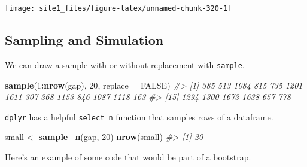 \documentclass[]{book}
\newenvironment{Shaded}{\begin{snugshade}}{\end{snugshade}}
\newcommand{\KeywordTok}[1]{\textcolor[rgb]{0.13,0.29,0.53}{\textbf{#1}}}
\newcommand{\DataTypeTok}[1]{\textcolor[rgb]{0.13,0.29,0.53}{#1}}
\newcommand{\DecValTok}[1]{\textcolor[rgb]{0.00,0.00,0.81}{#1}}
\newcommand{\StringTok}[1]{\textcolor[rgb]{0.31,0.60,0.02}{#1}}
\newcommand{\CommentTok}[1]{\textcolor[rgb]{0.56,0.35,0.01}{\textit{#1}}}
\newcommand{\OtherTok}[1]{\textcolor[rgb]{0.56,0.35,0.01}{#1}}
\newcommand{\OperatorTok}[1]{\textcolor[rgb]{0.81,0.36,0.00}{\textbf{#1}}}
\newcommand{\NormalTok}[1]{#1}
\begin{document}
\begin{center}\texttt{[image: site1\_files/figure-latex/unnamed-chunk-320-1]} \end{center}

\subsection{Sampling and Simulation}\label{sampling-and-simulation}

We can draw a sample with or without replacement with \texttt{sample}.

\begin{Shaded}
\begin{Highlighting}[]
\KeywordTok{sample}\NormalTok{(}\DecValTok{1}\OperatorTok{:}\KeywordTok{nrow}\NormalTok{(gap), }\DecValTok{20}\NormalTok{, }\DataTypeTok{replace =} \OtherTok{FALSE}\NormalTok{)}
\CommentTok{#>  [1]  385  513 1084  815  735 1201 1611  307  368 1153  846 1087 1118  163}
\CommentTok{#> [15] 1294 1300 1673 1638  657  778}
\end{Highlighting}
\end{Shaded}

\texttt{dplyr} has a helpful \texttt{select\_n} function that samples
rows of a dataframe.

\begin{Shaded}
\begin{Highlighting}[]
\NormalTok{small <-}\StringTok{ }\KeywordTok{sample_n}\NormalTok{(gap, }\DecValTok{20}\NormalTok{)}
\KeywordTok{nrow}\NormalTok{(small)}
\CommentTok{#> [1] 20}
\end{Highlighting}
\end{Shaded}

Here's an example of some code that would be part of a bootstrap.

\begin{Shaded}
\end{Shaded}
\end{document}
